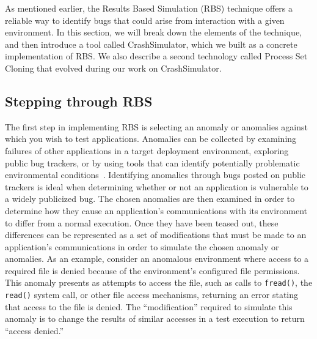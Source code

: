 As mentioned earlier,
the Results Based Simulation (RBS) technique
offers a reliable way to identify bugs
that could arise from interaction with a given environment.
In this section,
we will break down the elements of the technique,
and then introduce a tool called CrashSimulator,
which we built as a concrete implementation of RBS.
We also describe a second technology
called Process Set Cloning
that evolved during our work on CrashSimulator.


\subsection{Stepping through RBS}

The first step in implementing RBS
is selecting an anomaly or anomalies
against which you wish to test applications.
Anomalies can be collected
by examining failures of other applications
in a target deployment environment,
exploring public bug trackers,
or by using tools that can identify
potentially problematic environmental conditions~\cite{Zhuang_NSDI_2014,
rasley2015detecting}.
Identifying anomalies through bugs posted on public trackers
is ideal when determining
whether or not an application
is vulnerable to a widely publicized bug.
The chosen anomalies are then examined
in order to determine how they cause an application's communications
with its environment
to differ from a normal execution.
Once they have been teased out,
these differences can be represented
as a set of modifications
that must be made to an application's communications
in order to simulate the chosen anomaly or anomalies.
As an example,
consider an anomalous environment
where access to a required file is denied because of
the environment's configured file permissions.
This anomaly presents as attempts to access the file,
such as calls to {\tt fread()},
the {\tt read()} system call,
or other file access mechanisms,
returning an error stating that access to the file is denied.
The ``modification'' required to simulate this anomaly
is to change the results of similar accesses
in a test execution
to return ``access denied.''

